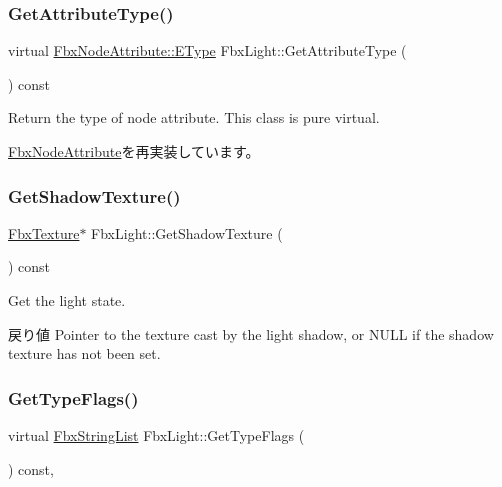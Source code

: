 \subsubsection{\texorpdfstring{Get\+Attribute\+Type()}{GetAttributeType()}}
{\footnotesize\ttfamily virtual \hyperlink{class_fbx_node_attribute_a08e1669d3d1a696910756ab17de56d6a}{Fbx\+Node\+Attribute\+::\+E\+Type} Fbx\+Light\+::\+Get\+Attribute\+Type (\begin{DoxyParamCaption}{ }\end{DoxyParamCaption}) const\hspace{0.3cm}{\ttfamily [virtual]}}

Return the type of node attribute. This class is pure virtual. 

\hyperlink{class_fbx_node_attribute_a1c2116756906127145a2b8721fc26752}{Fbx\+Node\+Attribute}を再実装しています。

\mbox{\label{class_fbx_light_a853f9998aa5dce0f60752794e58b0250}} 
\subsubsection{\texorpdfstring{Get\+Shadow\+Texture()}{GetShadowTexture()}}
{\footnotesize\ttfamily \hyperlink{class_fbx_texture}{Fbx\+Texture}$\ast$ Fbx\+Light\+::\+Get\+Shadow\+Texture (\begin{DoxyParamCaption}{ }\end{DoxyParamCaption}) const}

Get the light state. \begin{DoxyReturn}{戻り値}
Pointer to the texture cast by the light shadow, or {\ttfamily N\+U\+LL} if the shadow texture has not been set. 
\end{DoxyReturn}
\mbox{\label{class_fbx_light_a962256338837265748540bd0b3d9b511}} 
\subsubsection{\texorpdfstring{Get\+Type\+Flags()}{GetTypeFlags()}}
{\footnotesize\ttfamily virtual \hyperlink{class_fbx_string_list}{Fbx\+String\+List} Fbx\+Light\+::\+Get\+Type\+Flags (\begin{DoxyParamCaption}{ }\end{DoxyParamCaption}) const\hspace{0.3cm}{\ttfamily [protected]}, {\ttfamily [virtual]}}



